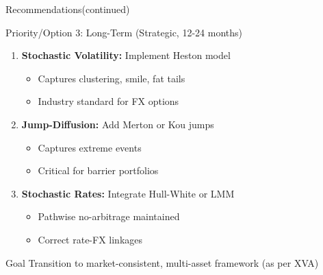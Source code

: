 \documentclass[11pt,aspectratio=169]{beamer}
\begin{document}
	\begin{frame}{Recommendations(continued)}
		\begin{block}{Priority/Option 3: Long-Term (Strategic, 12-24 months)}
			\begin{enumerate}
				\item \textbf{Stochastic Volatility:} Implement Heston model
				\begin{itemize}
					\item Captures clustering, smile, fat tails
					\item Industry standard for FX options
				\end{itemize}
				
				\item \textbf{Jump-Diffusion:} Add Merton or Kou jumps
				\begin{itemize}
					\item Captures extreme events
					\item Critical for barrier portfolios
				\end{itemize}
				
				\item \textbf{Stochastic Rates:} Integrate Hull-White or LMM
				\begin{itemize}
					\item Pathwise no-arbitrage maintained
					\item Correct rate-FX linkages
				\end{itemize}
			\end{enumerate}
		\end{block}
		
		\vspace{0.2cm}
		
		\begin{alertblock}{Goal}
			Transition to market-consistent, multi-asset framework (as per XVA)
		\end{alertblock}
	\end{frame}
	 
\end{document}
